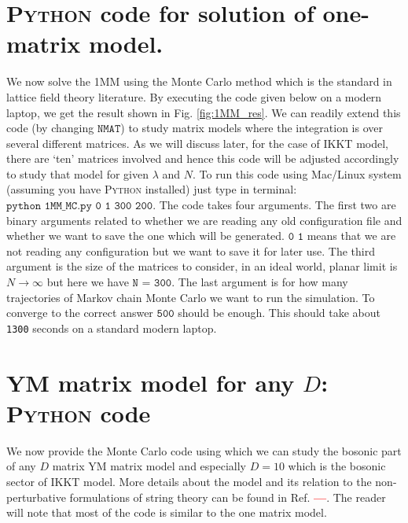 \documentclass[11pt]{article}
\newcommand{\TODO}[1]{\textcolor{red}{{\bf #1}}}
\newcommand{\PY}{\textsc{Python }}
\begin{document}
\section{\PY code for solution of one-matrix model.}
We now solve the 1MM using the Monte Carlo method which is the 
standard in lattice field theory literature. By executing the code given below
on a modern laptop, we get the result shown in 
Fig. \ref{fig:1MM_res}. We can readily extend this code (by changing $\texttt{NMAT}$) 
to study matrix models where the integration is over several different matrices. 
As we will discuss later, for the case of IKKT model, there are `ten' matrices 
involved and hence this code will be adjusted accordingly to study that model for given $\lambda$ and $N$. 
To run this code using Mac/Linux system (assuming you have \PY installed) just type in terminal: 
$\texttt{python 1MM\_MC.py 0 1 300 200}$. The code takes four arguments. The first two are binary arguments
related to whether we are reading any old configuration file and whether we want to save the one which will be 
generated. $\texttt{0 1}$ means that we are not reading any configuration but we want to save it for later use. 
The third argument is the size of the matrices to consider, in an ideal world, planar limit is $ N \to \infty$ but here
we have $\texttt{N = 300}$. The last argument is for 
how many trajectories of Markov chain Monte Carlo we want to run the simulation.
To converge to the correct answer $\texttt{500}$ should be enough. This should take about \texttt{1300} seconds
on a standard modern laptop.


\begin{footnotesize} 
\begin{mdframed}[backgroundcolor=mauve!3] 

\end{mdframed} 
\end{footnotesize} 
 
\section{YM matrix model for any $D$: \PY code}

We now provide the Monte Carlo code using which we can study the bosonic
part of any $D$ matrix YM matrix model and especially $D=10$ which is the bosonic sector of IKKT model.
More details about the model and its relation to the non-perturbative formulations of string theory can be found in Ref. \TODO{---}. 
The reader will note that most of the code is similar to the one matrix model. 
\end{document}
